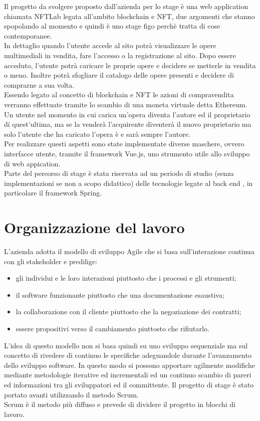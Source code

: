 Il progetto da svolgere proposto dall'azienda per lo stage è una web application chiamata NFTLab legata all'ambito blockchain e NFT, due argomenti che stanno spopolando al momento e quindi è uno stage figo perchè tratta di cose contemporanee.\\
In dettaglio quando l'utente accede al sito potrà visualizzare le opere multimediali in vendita, fare l'accesso o la registrazione al sito. Dopo essere acceduto, l'utente potrà caricare le proprie opere e decidere se metterle in vendita o meno. Inoltre potrà sfogliare il catalogo delle opere presenti e decidere di comprarne a sua volta.\\
Essendo legato al concetto di blockchain e NFT le azioni di compravendita verranno effettuate tramite lo scambio di una moneta virtuale detta Ethereum. Un utente nel momento in cui carica un'opera diventa l'autore ed il proprietario di quest'ultima, ma se la venderà l'acquirente diventerà il nuovo proprietario ma solo l'utente che ha caricato l'opera è e sarà sempre l'autore.\\
Per realizzare questi aspetti sono state implementate diverse maschere, ovvero interfacce utente, tramite il framework Vue.js, uno strumento utile allo sviluppo di web appication.\\
Parte del percorso di stage è stata riservata ad un periodo di studio (senza implementazioni se non a scopo didattico) delle tecnologie legate al back end , in particolare il framework Spring.

\section{Organizzazione del lavoro}

L'azienda adotta il modello di sviluppo Agile che si basa sull'interazione continua con gli stakeholder e predilige:
\begin{itemize}
	\item gli individui e le loro interazioni piuttosto che i processi e gli strumenti;
	\item il software funzionante piuttosto che una documentazione esaustiva;
	\item la collaborazione con il cliente piuttosto che la negoziazione dei contratti;
	\item essere propositivi verso il cambiamento piuttosto che rifiutarlo.
\end{itemize}
L'idea di questo modello non si basa quindi su uno sviluppo sequenziale ma sul concetto di rivedere di continuo le specifiche adeguandole durante l'avanzamento dello sviluppo software. In questo modo si possono apportare agilmente modifiche mediante metodologie iterative ed incrementali ed un continuo scambio di pareri ed informazioni tra gli sviluppatori ed il committente. Il progetto di stage è stato portato avanti utilizzando il metodo Scrum.\\
Scrum è il metodo più diffuso e prevede di dividere il progetto in blocchi di lavoro.

